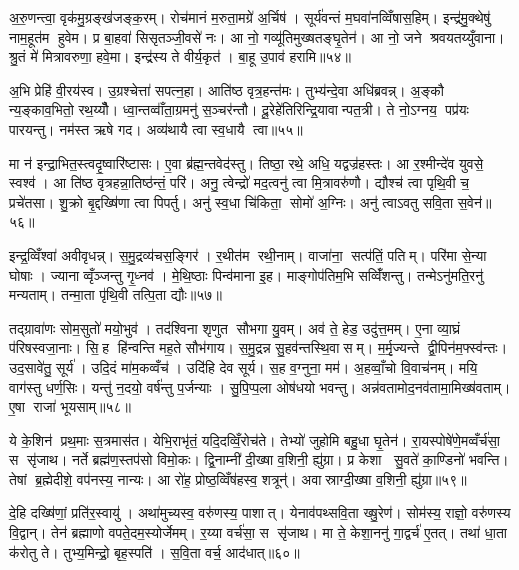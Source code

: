अ॒रु॒णन्त्वा॒ वृक॑मु॒ग्रङ्ख॑जङ्क॒रम्। रोच॑मानं म॒रुता॒मग्रे॑ अ॒र्चिष॑। सूर्य॑वन्तं म॒घवा॑नव्विँषास॒हिम्। इन्द्र॑मु॒क्थेषु॑ नाम॒हूत॑म हुवेम। प्र बा॒हवा॑ सिसृतञ्जी॒वसे॑ नः। आ नो॒ गव्यू॑तिमुख्षतङ्घृ॒तेन॑। आ नो॒ जने श्रवयतय्युँवाना। श्रु॒तं मे॑ मित्रावरुणा॒ हवे॒मा। इन्द्र॑स्य ते वीर्य॒कृत॑। बा॒हू उ॒पाव॑ हरामि॥५४॥\anuvakamend[ब॒भू॒वाव्य॑य॒त्तेने॒मम॑ग्न इ॒ह वर्च॑सा॒ सम॑ङ्ग्धि॒ वैया॒घ्रेऽधि॑ राष्ट्र॒वर्ध॑न॒पाङ्क्ते॑न॒ छन्द॑सो॒पाव॑हरामि]

अ॒भि प्रेहि॑ वी॒रय॑स्व। उ॒ग्रश्चेत्ता॑ सपत्न॒हा। आति॑ष्ठ वृत्र॒हन्त॑मः। तुभ्य॑न्दे॒वा अधि॑ब्रवन्न्। अ॒ङ्कौ न्य॒ङ्काव॒भितो॒ रथ॒य्यौँ। ध्वा॒न्तव्वाँ॑ता॒ग्रमनु॑ स॒ञ्चर॑न्तौ। दू॒रेहे॑तिरिन्द्रि॒यावान्पत॒त्री। ते नो॒ऽग्नय॒ पप्र॑यः पारयन्तु। नम॑स्त ऋषे गद। अव्य॑थायै त्वा स्व॒धायै त्वा॥५५॥

मा न॑ इन्द्रा॒भित॒स्त्वदृ॒ष्वारि॑ष्टासः। ए॒वा ब्र॑ह्म॒न्तवेद॑स्तु। तिष्ठा॒ रथे॒ अधि॒ यद्वज्र॑हस्तः। आ र॒श्मीन्दे॑व युवसे॒ स्वश्व॑। आ ति॑ष्ठ वृत्रहन्ना॒तिष्ठ॑न्तं॒ परि॑। अनु॒ त्वेन्द्रो॑ मद॒त्वनु॑ त्वा मि॒त्रावरु॑णौ। द्यौश्च॑ त्वा पृथि॒वी च॒ प्रचे॑तसा। शु॒क्रो बृ॒द्दख्षि॑णा त्वा पिपर्तु। अनु॑ स्व॒धा चि॑किता॒ सोमो॑ अ॒ग्निः। अनु॑ त्वाऽवतु सवि॒ता स॒वेन॑॥५६॥

इन्द्र॒व्विँश्वा॑ अवीवृधन्न्। स॒मु॒द्रव्य॑चस॒ङ्गिर॑। र॒थीत॑म रथी॒नाम्। वाजा॑ना॒ सत्प॑तिं॒ पतिम्। परि॑मा से॒न्या घोषाः। ज्यानाव्वृँञ्जन्तु गृ॒ध्नव॑। मे॒थि॒ष्ठाः पिन्व॑माना इ॒ह। माङ्गोप॑तिम॒भि सव्विँ॑शन्तु। तन्मेऽनु॑मति॒रनु॑ मन्यताम्। तन्मा॒ता पृ॑थि॒वी तत्पि॒ता द्यौः॥५७॥

तद्ग्रावा॑णः सोम॒सुतो॑ मयो॒भुव॑। तद॑श्विना शृणुत सौभगा यु॒वम्। अव॑ ते॒ हेड॒ उदु॑त्त॒मम्। ए॒ना व्या॒घ्रं प॑रिषस्वजा॒नाः। सि॒ह हि॑न्वन्ति मह॒ते सौभ॑गाय। स॒मु॒द्रन्न सु॒हव॑न्तस्थि॒वासम्। म॒र्मृ॒ज्यन्ते द्वी॒पिन॑म॒फ्स्व॑न्तः। उद॒सावे॑तु॒ सूर्य॑। उदि॒दं मा॑म॒कव्वँच॑। उदि॑हि देव सूर्य। स॒ह व॒ग्नुना॒ मम॑। अ॒हव्वाँ॒चो वि॒वाच॑नम्। मयि॒ वाग॑स्तु धर्ण॒सिः। यन्तु॑ न॒दयो॒ वर्\mbox{}ष॑न्तु प॒र्जन्याः। सु॒पि॒प्प॒ला ओष॑धयो भवन्तु। अन्न॑वतामोद॒नव॑तामा॒मिख्ष॑वताम्। ए॒षा राजा॑ भूयसाम्॥५८॥\anuvakamend[स्व॒धायै त्वा स॒वेन॒ द्यौः सूर्य स॒प्त च॑]

ये के॒शिन॑ प्रथ॒माः स॒त्रमास॑त। येभि॒राभृ॑तं॒ यदि॒दव्विँ॒रोच॑ते। तेभ्यो॑ जुहोमि बहु॒धा घृ॒तेन॑। रा॒यस्पोषे॑णे॒मव्वँर्च॑सा॒ स सृ॑जाथ। नर्ते ब्रह्म॑ण॒स्तप॑सो विमो॒कः। द्वि॒नाम्नी॑ दी॒ख्षा व॒शिनी॒ ह्यु॑ग्रा। प्र केशा सु॒वते॑ का॒ण्डिनो॑ भवन्ति। तेषां ब्र॒ह्मेदीशे॒ वप॑नस्य॒ नान्यः। आ रो॑ह॒ प्रोष्ठ॒व्विँष॑हस्व॒ शत्रून्॑। अवास्राग्दी॒ख्षा व॒शिनी॒ ह्यु॑ग्रा॥५९॥

दे॒हि दख्षि॑णां॒ प्रति॑र॒स्वायु॑। अथा॑मुच्यस्व॒ वरु॑णस्य॒ पाशात्। येनाव॑पथ्सवि॒ता ख्षु॒रेण॑। सोम॑स्य॒ राज्ञो॒ वरु॑णस्य वि॒द्वान्। तेन॑ ब्रह्माणो वपते॒दम॒स्योर्जेमम्। र॒य्या वर्च॑सा॒ स सृ॑जाथ। मा ते॒ केशा॒ननु॑ गा॒द्वर्च॑ ए॒तत्। तथा॑ धा॒ता क॑रोतु ते। तुभ्य॒मिन्द्रो॒ बृह॒स्पति॑। स॒वि॒ता वर्च॒ आद॑धात्॥६०॥

